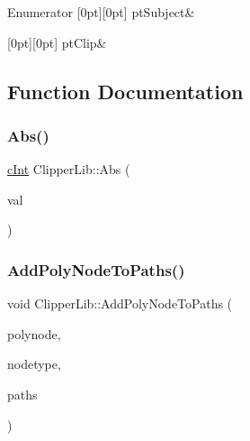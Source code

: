 \begin{DoxyEnumFields}{Enumerator}
[0pt][0pt]{}\mbox{\label{namespace_clipper_lib_a50d662440e5e100070014ed91281e960a67607ff4c7ca5fca8302236ff9a575b6}} 
pt\+Subject&\\
\hline

[0pt][0pt]{}\mbox{\label{namespace_clipper_lib_a50d662440e5e100070014ed91281e960a33152b07d096815ff64f4aeab67f0335}} 
pt\+Clip&\\
\hline

\end{DoxyEnumFields}


\subsection{Function Documentation}
\mbox{\label{namespace_clipper_lib_ad29f252d45c594ccd3030cf966baa2e4}} 
\subsubsection{\texorpdfstring{Abs()}{Abs()}}
{\footnotesize\ttfamily \mbox{\hyperlink{namespace_clipper_lib_a7156730a24951629192d4831334bafaa}{c\+Int}} Clipper\+Lib\+::\+Abs (\begin{DoxyParamCaption}\item[{\mbox{\hyperlink{namespace_clipper_lib_a7156730a24951629192d4831334bafaa}{c\+Int}}}]{val }\end{DoxyParamCaption})\hspace{0.3cm}{\ttfamily [inline]}}

\mbox{\label{namespace_clipper_lib_a4644758856e780ca359c3e37065397a6}} 
\subsubsection{\texorpdfstring{AddPolyNodeToPaths()}{AddPolyNodeToPaths()}}
{\footnotesize\ttfamily void Clipper\+Lib\+::\+Add\+Poly\+Node\+To\+Paths (\begin{DoxyParamCaption}\item[{const \mbox{\hyperlink{class_clipper_lib_1_1_poly_node}{Poly\+Node}} \&}]{polynode,  }\item[{\mbox{\hyperlink{namespace_clipper_lib_a31e9eef1fdd14cee54118420090b61d3}{Node\+Type}}}]{nodetype,  }\item[{\mbox{\hyperlink{namespace_clipper_lib_a4bab1d9e10805fa6f1fd3b78c56efcfe}{Paths}} \&}]{paths }\end{DoxyParamCaption})}

